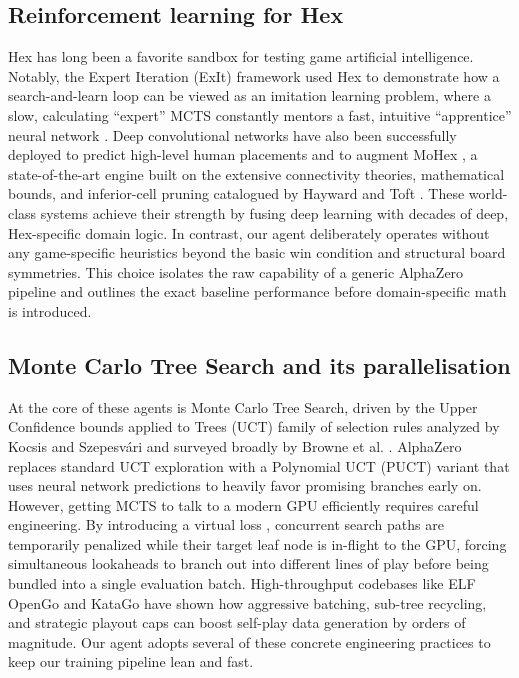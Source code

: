 \documentclass[conference]{IEEEtran}
\begin{document}
\subsection{Reinforcement learning for Hex}
Hex has long been a favorite sandbox for testing game artificial intelligence. Notably, the Expert Iteration (ExIt) framework used Hex to demonstrate how a search-and-learn loop can be viewed as an imitation learning problem, where a slow, calculating ``expert'' MCTS constantly mentors a fast, intuitive ``apprentice'' neural network \cite{anthony2017thinking}. Deep convolutional networks have also been successfully deployed to predict high-level human placements and to augment MoHex \cite{gao2017move}, a state-of-the-art engine built on the extensive connectivity theories, mathematical bounds, and inferior-cell pruning catalogued by Hayward and Toft \cite{hayward2019hex}. These world-class systems achieve their strength by fusing deep learning with decades of deep, Hex-specific domain logic. In contrast, our agent deliberately operates without any game-specific heuristics beyond the basic win condition and structural board symmetries. This choice isolates the raw capability of a generic AlphaZero pipeline and outlines the exact baseline performance before domain-specific math is introduced.

\subsection{Monte Carlo Tree Search and its parallelisation}
At the core of these agents is Monte Carlo Tree Search, driven by the Upper Confidence bounds applied to Trees (UCT) family of selection rules analyzed by Kocsis and Szepesv\'ari \cite{kocsis2006bandit} and surveyed broadly by Browne et al. \cite{browne2012survey}. AlphaZero replaces standard UCT exploration with a Polynomial UCT (PUCT) variant that uses neural network predictions to heavily favor promising branches early on. However, getting MCTS to talk to a modern GPU efficiently requires careful engineering. By introducing a virtual loss \cite{chaslot2008parallel}, concurrent search paths are temporarily penalized while their target leaf node is in-flight to the GPU, forcing simultaneous lookaheads to branch out into different lines of play before being bundled into a single evaluation batch. High-throughput codebases like ELF OpenGo \cite{tian2019elf} and KataGo \cite{wu2019accelerating} have shown how aggressive batching, sub-tree recycling, and strategic playout caps can boost self-play data generation by orders of magnitude. Our agent adopts several of these concrete engineering practices to keep our training pipeline lean and fast.
\end{document}
